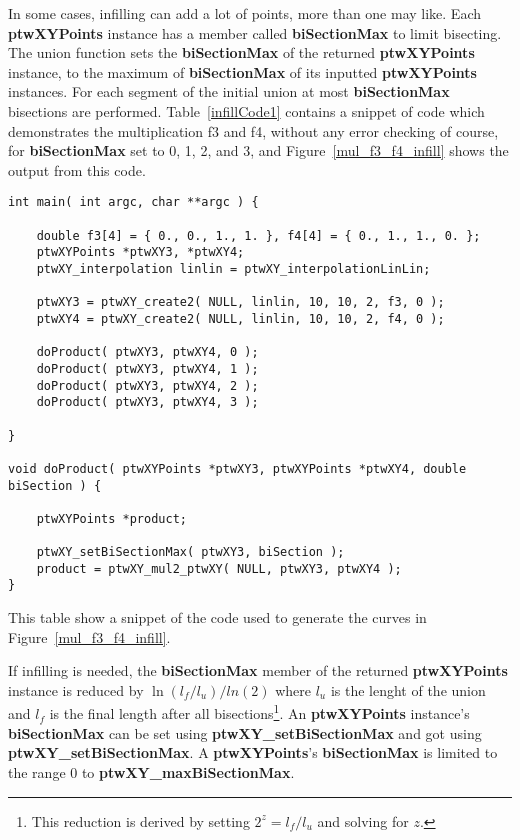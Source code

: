 \documentclass[11pt]{article}
\newcommand{\highlight}[1]{{\bf #1}}
\begin{document}
In some cases, infilling can add a lot of points, more than one may like. Each \highlight{ptwXYPoints}
instance has a member called \highlight{biSectionMax} to limit bisecting. The union function sets the
\highlight{biSectionMax} of the returned \highlight{ptwXYPoints} instance, to the maximum of \highlight{biSectionMax} of
its inputted \highlight{ptwXYPoints} instances. For each segment of the initial union at most
\highlight{biSectionMax} bisections are performed. Table~\ref{infillCode1} contains a snippet of code which
demonstrates the multiplication f3 and f4, without any error checking of course, for \highlight{biSectionMax}
set to 0, 1, 2, and 3, and Figure~\ref{mul_f3_f4_infill} shows the output from this code.

\begin{table}
\begin{verbatim}
int main( int argc, char **argc ) {

    double f3[4] = { 0., 0., 1., 1. }, f4[4] = { 0., 1., 1., 0. };
    ptwXYPoints *ptwXY3, *ptwXY4;
    ptwXY_interpolation linlin = ptwXY_interpolationLinLin;

    ptwXY3 = ptwXY_create2( NULL, linlin, 10, 10, 2, f3, 0 );
    ptwXY4 = ptwXY_create2( NULL, linlin, 10, 10, 2, f4, 0 );

    doProduct( ptwXY3, ptwXY4, 0 );
    doProduct( ptwXY3, ptwXY4, 1 );
    doProduct( ptwXY3, ptwXY4, 2 );
    doProduct( ptwXY3, ptwXY4, 3 );

}

void doProduct( ptwXYPoints *ptwXY3, ptwXYPoints *ptwXY4, double biSection ) {

    ptwXYPoints *product;

    ptwXY_setBiSectionMax( ptwXY3, biSection );
    product = ptwXY_mul2_ptwXY( NULL, ptwXY3, ptwXY4 );
}
\end{verbatim}
\caption{This table show a snippet of the code used to generate the curves in Figure~\ref{mul_f3_f4_infill}.} \label{infillCode1}
\end{table}


If infilling is needed, the \highlight{biSectionMax} member of the returned \highlight{ptwXYPoints} instance is reduced by 
$\ln(l_f / l_u) / ln(2)$ where $l_u$ is the lenght of the union and $l_f$ is the final length after all bisections\footnote{This reduction is derived
by setting $2^z = l_f/l_u$ and solving for $z$.}. An \highlight{ptwXYPoints} instance's \highlight{biSectionMax} can be set using
\highlight{ptwXY\_setBiSectionMax} and got using \highlight{ptwXY\_setBiSectionMax}. A \highlight{ptwXYPoints}'s
\highlight{biSectionMax} is limited to the range 0 to \highlight{ptwXY\_maxBiSectionMax}.
\end{document}
